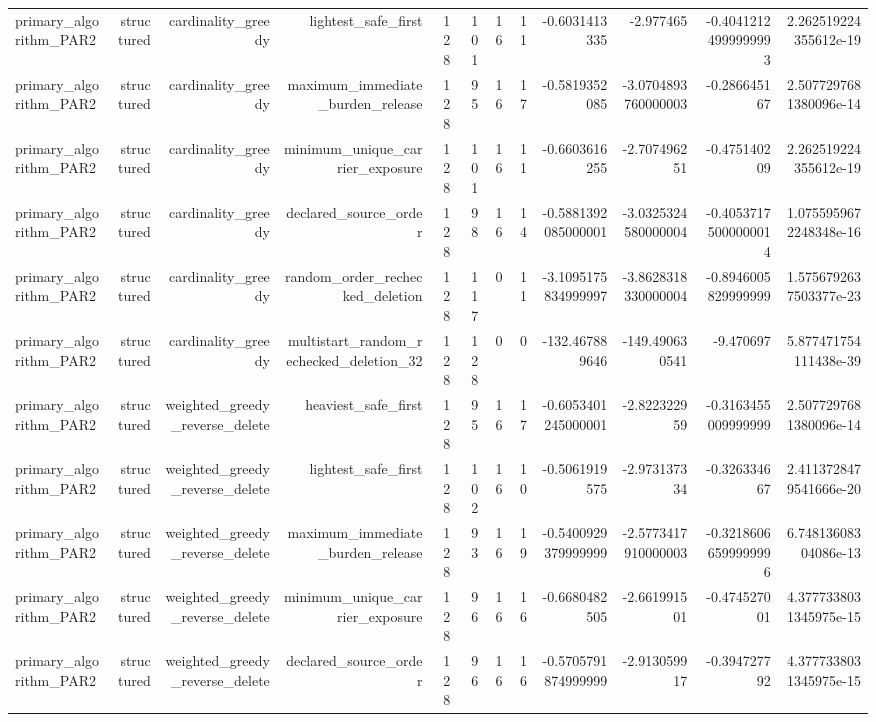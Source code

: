 {\begin{longtable}{lrrrrrrrrrrr}
primary\_algorithm\_PAR2 & structured & cardinality\_greedy & lightest\_safe\_first & 128 & 101 & 16 & 11 & -0.6031413335 & -2.977465 & -0.40412124999999993 & 2.262519224355612e-19 \\
primary\_algorithm\_PAR2 & structured & cardinality\_greedy & maximum\_immediate\_burden\_release & 128 & 95 & 16 & 17 & -0.5819352085 & -3.0704893760000003 & -0.286645167 & 2.5077297681380096e-14 \\
primary\_algorithm\_PAR2 & structured & cardinality\_greedy & minimum\_unique\_carrier\_exposure & 128 & 101 & 16 & 11 & -0.6603616255 & -2.707496251 & -0.475140209 & 2.262519224355612e-19 \\
primary\_algorithm\_PAR2 & structured & cardinality\_greedy & declared\_source\_order & 128 & 98 & 16 & 14 & -0.5881392085000001 & -3.0325324580000004 & -0.40537175000000014 & 1.0755959672248348e-16 \\
primary\_algorithm\_PAR2 & structured & cardinality\_greedy & random\_order\_rechecked\_deletion & 128 & 117 & 0 & 11 & -3.1095175834999997 & -3.8628318330000004 & -0.8946005829999999 & 1.5756792637503377e-23 \\
primary\_algorithm\_PAR2 & structured & cardinality\_greedy & multistart\_random\_rechecked\_deletion\_32 & 128 & 128 & 0 & 0 & -132.467889646 & -149.490630541 & -9.470697 & 5.877471754111438e-39 \\
primary\_algorithm\_PAR2 & structured & weighted\_greedy\_reverse\_delete & heaviest\_safe\_first & 128 & 95 & 16 & 17 & -0.6053401245000001 & -2.822322959 & -0.3163455009999999 & 2.5077297681380096e-14 \\
primary\_algorithm\_PAR2 & structured & weighted\_greedy\_reverse\_delete & lightest\_safe\_first & 128 & 102 & 16 & 10 & -0.5061919575 & -2.973137334 & -0.326334667 & 2.4113728479541666e-20 \\
primary\_algorithm\_PAR2 & structured & weighted\_greedy\_reverse\_delete & maximum\_immediate\_burden\_release & 128 & 93 & 16 & 19 & -0.5400929379999999 & -2.5773417910000003 & -0.32186066599999996 & 6.74813608304086e-13 \\
primary\_algorithm\_PAR2 & structured & weighted\_greedy\_reverse\_delete & minimum\_unique\_carrier\_exposure & 128 & 96 & 16 & 16 & -0.6680482505 & -2.661991501 & -0.474527001 & 4.3777338031345975e-15 \\
primary\_algorithm\_PAR2 & structured & weighted\_greedy\_reverse\_delete & declared\_source\_order & 128 & 96 & 16 & 16 & -0.5705791874999999 & -2.913059917 & -0.394727792 & 4.3777338031345975e-15 \\

\end{longtable}}
